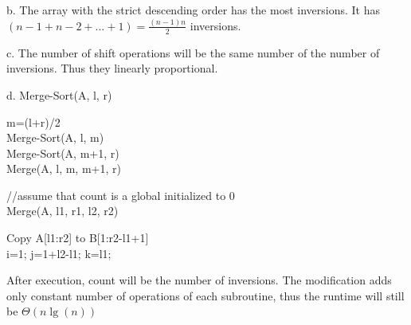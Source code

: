 \documentclass[]{article}
\begin{document}
\begin{enumerate}
b. The array with the strict descending order has the most inversions. It has $(n-1 + n-2 + ... + 1) = \frac{(n-1)n}{2}$ inversions.

c. The number of shift operations will be the same number of the number of inversions. Thus they linearly proportional.

d. Merge-Sort(A, l, r)\\
\begin{algorithm}[H]
	m=(l+r)/2\\
	Merge-Sort(A, l, m)\\
	Merge-Sort(A, m+1, r)\\
	Merge(A, l, m, m+1, r)
\end{algorithm}

//assume that count is a global initialized to 0\\
Merge(A, l1, r1, l2, r2)\\
\begin{algorithm}[H]
	Copy A[l1:r2] to B[1:r2-l1+1]\\
	i=1; j=1+l2-l1; k=l1;\\
\end{algorithm}

After execution, count will be the number of inversions. The modification adds only constant number of operations of each subroutine, thus the runtime will still be $\Theta(n\lg(n))$


\end{enumerate}
\end{document}
